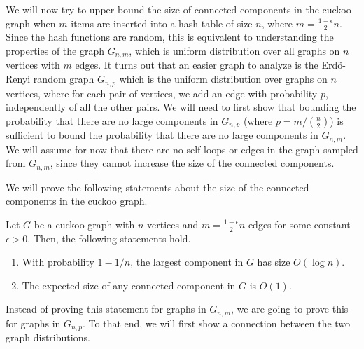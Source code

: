 We will now try to upper bound the size of connected components in the cuckoo
graph when $m$ items are inserted into a hash table of size $n$, where
$m = \tfrac{1-\epsilon}{2}n$. Since the hash functions are random, this is
equivalent to understanding the properties of the graph $G_{n,m}$, which is
uniform distribution over all graphs on $n$ vertices with $m$ edges. It turns
out that an easier graph to analyze is the Erd\"{o}-Renyi random graph $G_{n,p}$
which is the uniform distribution over graphs on $n$ vertices, where for each
pair of vertices, we add an edge with probability $p$, independently of all the
other pairs. We will need to first show that
bounding the probability that there are no large components in $G_{n,p}$ (where
$p=m/\binom{n}{2}$) is sufficient to bound the probability that there are no
large components in $G_{n,m}$. We will assume for now that there are no
self-loops or edges in the graph sampled from $G_{n,m}$, since they cannot
increase the size of the connected components.

We will prove the following statements about the size of the connected
components in the cuckoo graph.
\begin{theorem}
  Let $G$ be a cuckoo graph with $n$ vertices and $m = \frac{1-\epsilon}{2} n$
  edges for some constant $\epsilon > 0$. Then, the following statements hold.
  \begin{enumerate}
  \item With probability $1 - 1/n$, the largest component in $G$ has size $O(\log n)$.
  \item The expected size of any connected component in $G$ is $O(1)$.
  \end{enumerate}
  \label{thm:cuckoo-cc}
\end{theorem}

Instead of proving this statement for graphs in $G_{n,m}$, we are going to prove
this for graphs in $G_{n,p}$. To that end, we will first show a connection
between the two graph distributions.

